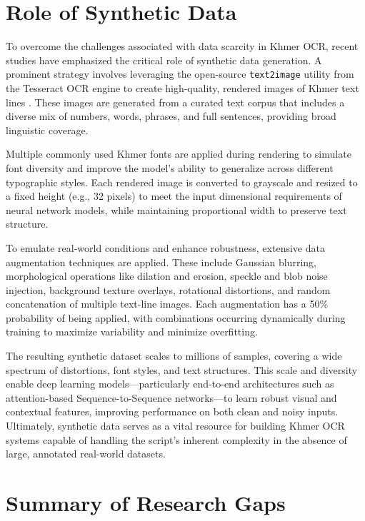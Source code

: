 \section{Role of Synthetic Data}
\label{sec:dl-models}

To overcome the challenges associated with data scarcity in Khmer OCR, 
recent studies have emphasized the critical role of synthetic data generation. A prominent 
strategy involves leveraging the open-source \texttt{text2image} utility from the Tesseract OCR 
engine to create high-quality, rendered images of Khmer text lines \citep{buoy2021seq2seq}. 
These images are generated from a curated text corpus that includes a diverse mix of numbers, 
words, phrases, and full sentences, providing broad linguistic coverage.

Multiple commonly used Khmer fonts are applied during rendering to simulate font diversity and 
improve the model's ability to generalize across different typographic styles. Each rendered 
image is converted to grayscale and resized to a fixed height (e.g., 32 pixels) to meet the input 
dimensional requirements of neural network models, while maintaining proportional width to preserve 
text structure.

To emulate real-world conditions and enhance robustness, extensive data augmentation techniques 
are applied. These include Gaussian blurring, morphological operations like dilation and erosion, 
speckle and blob noise injection, background texture overlays, rotational distortions, and random 
concatenation of multiple text-line images. Each augmentation has a 50\% probability of being applied, 
with combinations occurring dynamically during training to maximize variability and minimize overfitting.

The resulting synthetic dataset scales to millions of samples, covering a wide spectrum of distortions, 
font styles, and text structures. This scale and diversity enable deep learning models—particularly 
end-to-end architectures such as attention-based Sequence-to-Sequence networks—to learn robust 
visual and contextual features, improving performance on both clean and noisy inputs. Ultimately, 
synthetic data serves as a vital resource for building Khmer OCR systems capable of handling the 
script’s inherent complexity in the absence of large, annotated real-world datasets.


\section{Summary of Research Gaps}
\label{sec:research-gaps}

